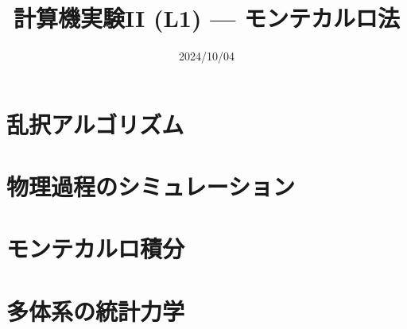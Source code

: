 \documentclass[10pt,dvipdfmx]{beamer}
\title{計算機実験II (L1) --- モンテカルロ法}
\date{2024/10/04}
\begin{document}
\begin{frame}
  \titlepage
  \tableofcontents
\end{frame}


% 

\section{乱択アルゴリズム}






\section{物理過程のシミュレーション}






\section{モンテカルロ積分}












\section{多体系の統計力学}
\end{document}
